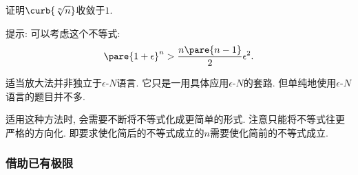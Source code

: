\documentclass{ctexart}
\begin{document}
\begin{sample}
    \begin{ex}
        证明$\curb{\sqrt[n]{n}}$收敛于$1$.
    \end{ex}
    提示: 可以考虑这个不等式:
    \[ \pare{1+\epsilon}^n > \frac{n\pare{n-1}}{2}\epsilon^2. \]
\end{sample}
\begin{remark}
    适当放大法并非独立于$\epsilon$-$N$语言. 它只是一用具体应用$\epsilon$-$N$的套路. 但单纯地使用$\epsilon$-$N$语言的题目并不多.
\end{remark}
\begin{remark}
    适用这种方法时, 会需要不断将不等式化成更简单的形式. 注意{\color{red}只能将不等式往更严格的方向化}. 即要求使化简后的不等式成立的$n$需要使化简前的不等式成立.
\end{remark}


\subsubsection{借助已有极限} %
\label{ssub:借助已有极限}
\end{document}
